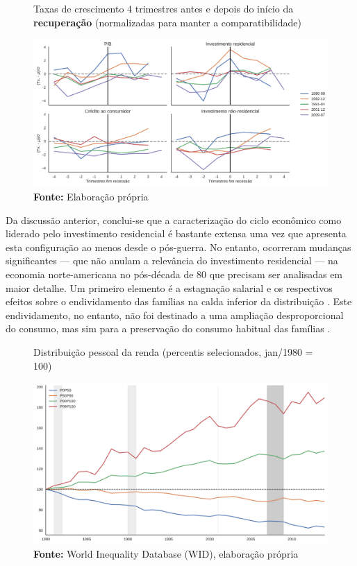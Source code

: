 \begin{figure}[H]
	\centering
	\caption{Taxas de crescimento 4 trimestres antes e depois do início da  \textbf{recuperação} (normalizadas para manter a comparatibilidade)}
	\label{FigRecuperacaoNorm}
	\includegraphics[width=\textwidth]{../../Dados/Fatos_Estilizados/figs/Centrado_Fim_Norm.png}
	\caption*{\textbf{Fonte:} Elaboração própria}
\end{figure}



Da discussão anterior, conclui-se que a caracterização do ciclo econômico como liderado pelo investimento residencial é bastante extensa uma vez que apresenta esta configuração ao menos desde o pós-guerra.
No entanto, ocorreram mudanças significantes --- que não anulam a relevância do investimento residencial --- na economia norte-americana no pós-década de 80 que precisam ser analisadas em maior detalhe.
Um primeiro elemento é a estagnação salarial e os respectivos efeitos sobre o endividamento das famílias na calda inferior da distribuição \cites{barba_rising_2009}{teixeira_uma_2011}. 
Este endividamento, no entanto, não foi destinado a uma ampliação desproporcional do consumo, mas sim para a preservação do consumo habitual das famílias
\cites{wolf_rising_2010}{cynamon_inequality_2013}.


\begin{figure}[H]
	\centering
	\caption{Distribuição pessoal da renda (percentis selecionados, jan/1980 = 100)}
	\label{FigDistPessoal}
	\includegraphics[width=\textwidth]{../../Dados/Fatos_Estilizados/figs/Dist_Pessoal.png}
	\caption*{\textbf{Fonte:} World Inequality Database (WID), elaboração própria}
\end{figure}


